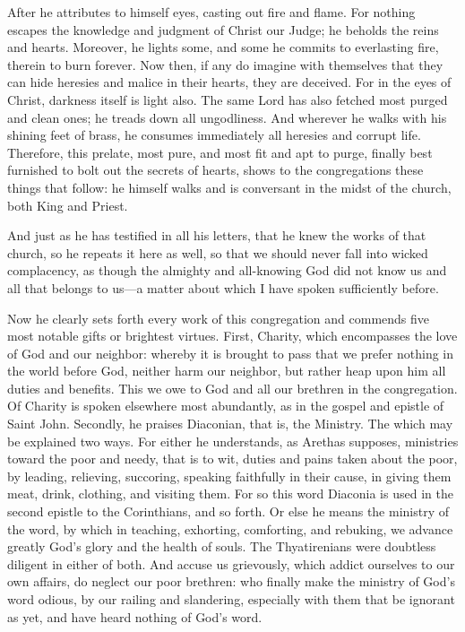 After he attributes to himself eyes, casting out fire and flame. For nothing escapes the knowledge and judgment of Christ our Judge; he beholds the reins and hearts. Moreover, he lights some, and some he commits to everlasting fire, therein to burn forever. Now then, if any do imagine with themselves that they can hide heresies and malice in their hearts, they are deceived. For in the eyes of Christ, darkness itself is light also. The same Lord has also fetched most purged and clean ones; he treads down all ungodliness. And wherever he walks with his shining feet of brass, he consumes immediately all heresies and corrupt life. Therefore, this prelate, most pure, and most fit and apt to purge, finally best furnished to bolt out the secrets of hearts, shows to the congregations these things that follow: he himself walks and is conversant in the midst of the church, both King and Priest.

And just as he has testified in all his letters, that he knew the works of that church, so he repeats it here as well, so that we should never fall into wicked complacency, as though the almighty and all-knowing God did not know us and all that belongs to us—a matter about which I have spoken sufficiently before.

Now he clearly sets forth every work of this congregation and commends five most notable gifts or brightest virtues. First, Charity, which encompasses the love of God and our neighbor: whereby it is brought to pass that we prefer nothing in the world before God, neither harm our neighbor, but rather heap upon him all duties and benefits. This we owe to God and all our brethren in the congregation. Of Charity is spoken elsewhere most abundantly, as in the gospel and epistle of Saint John. Secondly, he praises Diaconian, that is, the Ministry. The which may be explained two ways. For either he understands, as Arethas supposes, ministries toward the poor and needy, that is to wit, duties and pains taken about the poor, by leading, relieving, succoring, speaking faithfully in their cause, in giving them meat, drink, clothing, and visiting them. For so this word Diaconia is used in the second epistle to the Corinthians, and so forth. Or else he means the ministry of the word, by which in teaching, exhorting, comforting, and rebuking, we advance greatly God’s glory and the health of souls. The Thyatirenians were doubtless diligent in either of both. And accuse us grievously, which addict ourselves to our own affairs, do neglect our poor brethren: who finally make the ministry of God’s word odious, by our railing and slandering, especially with them that be ignorant as yet, and have heard nothing of God’s word.

